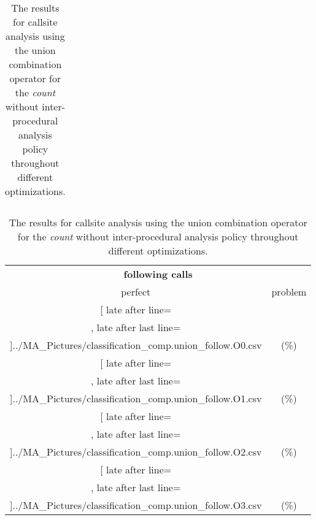 \begin{table}[!htbp]
{\begin{tabular}{l|c|c|c}
    	\end{tabular}

	\begin{tabular}{|c|c}%

	\toprule
	\multicolumn{2}{c}{\bfseries  following calls}\\
	
	perfect &  problem %
	\\\midrule
	\csvreader[ late after line=\\, late after last line=\\\midrule]{../MA_Pictures/classification_comp.union_follow.O0.csv}{
}
	{\csvcoliv (\csvcolv \%) & \csvcolvi (\csvcolvii\%)}%



\multicolumn{1}{c}{} 
	\\\midrule
	\csvreader[ late after line=\\, late after last line=\\\midrule]{../MA_Pictures/classification_comp.union_follow.O1.csv}{
}
	{\csvcoliv (\csvcolv \%) & \csvcolvi (\csvcolvii\%)}%
	
	
\multicolumn{1}{c}{}
	\\\midrule
	\csvreader[ late after line=\\, late after last line=\\\midrule]{../MA_Pictures/classification_comp.union_follow.O2.csv}{
}
	{\csvcoliv (\csvcolv \%) & \csvcolvi (\csvcolvii\%)}%
	

\multicolumn{1}{c}{}
	\\\midrule
	\csvreader[ late after line=\\, late after last line=\\\bottomrule]{../MA_Pictures/classification_comp.union_follow.O3.csv}{
}
	{\csvcoliv (\csvcolv \%) & \csvcolvi (\csvcolvii\%)}%


    	\end{tabular}
}
		\caption {The results for callsite analysis using the union combination operator for the \textit{count} without inter-procedural analysis policy throughout different optimizations.}
		\label{tbl:CSunionCOUNTnointer}
\end{table}
